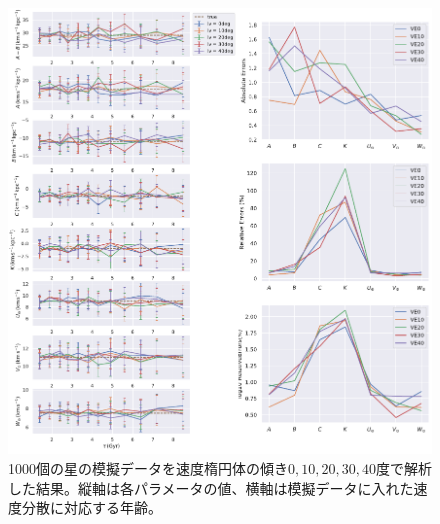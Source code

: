\begin{figure}[htbp]
	\centering
	\includegraphics[width=15cm]{fig/Mock_VE.pdf}
	\caption{1000個の星の模擬データを速度楕円体の傾き$0,10,20,30,40$度で解析した結果。縦軸は各パラメータの値、横軸は模擬データに入れた速度分散に対応する年齢。} \label{fig:Mock_VE}
\end{figure}



